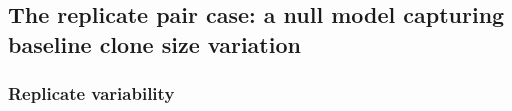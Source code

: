 \documentclass[letterpaper,english,prl,reprint,longbibliography]{revtex4-1} %
\begin{document}

\subsection{The replicate pair case: a null model capturing baseline clone size variation} \label{sec:rep_pair}

\subsubsection*{Replicate variability}
\end{document}
